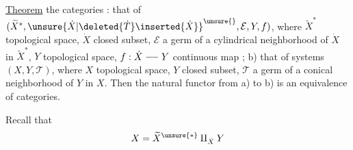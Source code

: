 \uline{Theorem}  the  categories  :
 that of 
$(\widetilde X^*,{\unsure{\dot X|\deleted{\dot T}\inserted{\dot X}}}^{\unsure{}},\mathcal E,Y,f)$, where
$\widetilde X^*$ topological space, $\dot X$ closed subset, $\mathcal E$ a germ
of a cylindrical neighborhood of $\dot X$ in $\widetilde X^*$,
$Y$ topological space, $f:\dot X\mathrel{\relbar\joinrel\relbar}Y$ continuous map ;
b) that of systems $(X,Y,\mathcal T)$, where
$X$ topological space, $Y$ closed subset, $\mathcal T$ a germ
of a conical neighborhood of $Y$ in $X$. 
 Then the natural functor  from a)
to b) is an equivalence of categories.


Recall that
\[
X=\widetilde X^{\unsure{*}}\amalg_{\dot X}Y
\]


